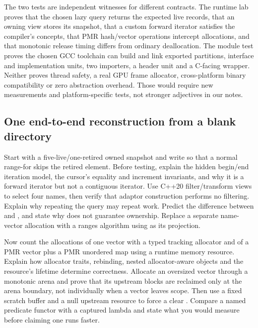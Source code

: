 The two tests are independent witnesses for different contracts. The runtime lab proves that the chosen lazy query returns the expected live records, that an owning view stores its snapshot, that a custom forward iterator satisfies the compiler's concepts, that PMR hash/vector operations intercept allocations, and that monotonic release timing differs from ordinary deallocation. The module test proves the chosen GCC toolchain can build and link exported partitions, interface and implementation units, two importers, a header unit and a C-facing wrapper. Neither proves thread safety, a real GPU frame allocator, cross-platform binary compatibility or zero abstraction overhead. Those would require new measurements and platform-specific tests, not stronger adjectives in our notes.

\subsection{One end-to-end reconstruction from a blank directory}\label{01-foundations-i-ch006-one-end-to-end-reconstruction-from-a-blank-directory}

\hypertarget{01-foundations-i-ch006-one-end-to-end-reconstruction-from-a-blank-directory}{}

Start with a five-live/one-retired owned snapshot and write  so that a normal range-for skips the retired element. Before testing, explain the hidden begin/end iteration model, the cursor's equality and increment invariants, and why it is a forward iterator but not a contiguous iterator. Use C++20 filter/transform views to select four names, then verify that adaptor construction performs no filtering. Explain why repeating the query may repeat work. Predict the difference between  and , and state why  does not guarantee ownership. Replace a separate name-vector allocation with a ranges algorithm using  as its projection.

Now count the allocations of one vector with a typed tracking allocator and of a PMR vector plus a PMR unordered map using a runtime memory resource. Explain how allocator traits, rebinding, nested allocator-aware objects and the resource's lifetime determine correctness. Allocate an oversized vector through a monotonic arena and prove that its upstream blocks are reclaimed only at the arena boundary, not individually when a vector leaves scope. Then use a fixed scratch buffer and a null upstream resource to force a clear . Compare a named predicate functor with a captured lambda and state what you would measure before claiming one runs faster.

